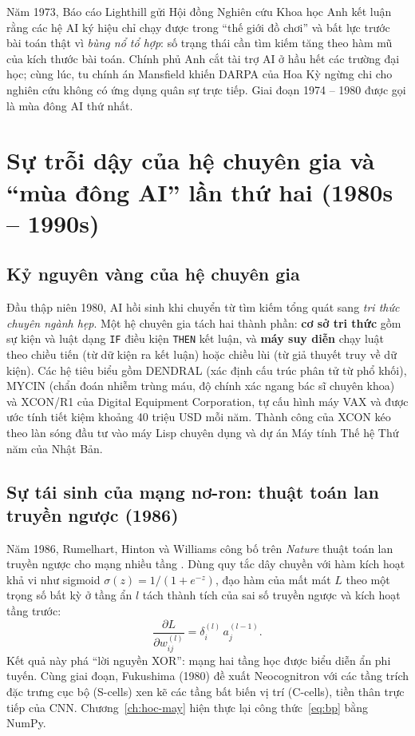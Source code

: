 Năm 1973, Báo cáo Lighthill \cite{lighthill1973} gửi Hội đồng Nghiên cứu Khoa học Anh kết luận rằng các hệ AI ký hiệu
chỉ chạy được trong “thế giới đồ chơi” và bất lực trước bài toán thật vì \emph{bùng nổ tổ hợp}: số trạng thái cần tìm
kiếm tăng theo hàm mũ của kích thước bài toán. Chính phủ Anh cắt tài trợ AI ở hầu hết các trường đại học; cùng lúc, tu
chính án Mansfield khiến DARPA của Hoa Kỳ ngừng chi cho nghiên cứu không có ứng dụng quân sự trực tiếp. Giai đoạn
1974 -- 1980 được gọi là mùa đông AI thứ nhất.

\section{Sự trỗi dậy của hệ chuyên gia và “mùa đông AI” lần thứ hai (1980s -- 1990s)}

\subsection{Kỷ nguyên vàng của hệ chuyên gia}

Đầu thập niên 1980, AI hồi sinh khi chuyển từ tìm kiếm tổng quát sang \emph{tri thức chuyên ngành hẹp}. Một hệ chuyên
gia tách hai thành phần: \textbf{cơ sở tri thức} gồm sự kiện và luật dạng \texttt{IF} điều kiện \texttt{THEN} kết luận,
và \textbf{máy suy diễn} chạy luật theo chiều tiến (từ dữ kiện ra kết luận) hoặc chiều lùi (từ giả thuyết truy về dữ
kiện). Các hệ tiêu biểu gồm DENDRAL (xác định cấu trúc phân tử từ phổ khối), MYCIN (chẩn đoán nhiễm trùng máu, độ chính
xác ngang bác sĩ chuyên khoa) và XCON/R1 của Digital Equipment Corporation, tự cấu hình máy VAX và được ước tính tiết
kiệm khoảng 40 triệu USD mỗi năm. Thành công của XCON kéo theo làn sóng đầu tư vào máy Lisp chuyên dụng và dự án Máy
tính Thế hệ Thứ năm của Nhật Bản.

\subsection{Sự tái sinh của mạng nơ-ron: thuật toán lan truyền ngược (1986)}

Năm 1986, Rumelhart, Hinton và Williams công bố trên \emph{Nature} thuật toán lan truyền ngược cho mạng nhiều tầng
\cite{rumelhart1986}. Dùng quy tắc dây chuyền với hàm kích hoạt khả vi như sigmoid $\sigma(z) = 1/(1+e^{-z})$, đạo hàm
của mất mát $L$ theo một trọng số bất kỳ ở tầng ẩn $l$ tách thành tích của sai số truyền ngược và kích hoạt tầng trước:
\begin{equation}
  \frac{\partial L}{\partial w^{(l)}_{ij}} = \delta^{(l)}_i \, a^{(l-1)}_j .
  \label{eq:bp}
\end{equation}
Kết quả này phá “lời nguyền XOR”: mạng hai tầng học được biểu diễn ẩn phi tuyến. Cùng giai đoạn, Fukushima
(1980) đề xuất Neocognitron \cite{fukushima1980} với các tầng trích đặc trưng cục bộ (S-cells) xen kẽ các tầng bất biến
vị trí (C-cells), tiền thân trực tiếp của CNN. Chương~\ref{ch:hoc-may} hiện thực lại công thức~\eqref{eq:bp} bằng NumPy.

